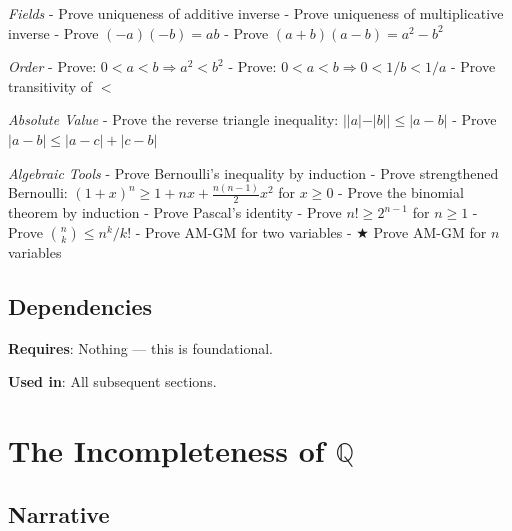 \documentclass[
  10pt,
  letterpaper,
]{scrbook}
\newcommand{\QQ}{\mathbb{Q}}
\begin{document}
\emph{Fields} - Prove uniqueness of additive inverse - Prove uniqueness
of multiplicative inverse - Prove \((-a)(-b) = ab\) - Prove
\((a+b)(a-b) = a^2 - b^2\)

\emph{Order} - Prove: \(0 < a < b \Rightarrow a^2 < b^2\) - Prove:
\(0 < a < b \Rightarrow 0 < 1/b < 1/a\) - Prove transitivity of \(<\)

\emph{Absolute Value} - Prove the reverse triangle inequality:
\(||a| - |b|| \leq |a - b|\) - Prove \(|a - b| \leq |a - c| + |c - b|\)

\emph{Algebraic Tools} - Prove Bernoulli's inequality by induction -
Prove strengthened Bernoulli:
\((1+x)^n \geq 1 + nx + \frac{n(n-1)}{2}x^2\) for \(x \geq 0\) - Prove
the binomial theorem by induction - Prove Pascal's identity - Prove
\(n! \geq 2^{n-1}\) for \(n \geq 1\) - Prove
\(\binom{n}{k} \leq n^k / k!\) - Prove AM-GM for two variables - ★ Prove
AM-GM for \(n\) variables

\subsection{Dependencies}\label{dependencies}

\textbf{Requires}: Nothing --- this is foundational.

\textbf{Used in}: All subsequent sections.

\section{\texorpdfstring{The Incompleteness of
\(\QQ\)}{The Incompleteness of \textbackslash QQ}}\label{the-incompleteness-of-qq}

\subsection{Narrative}\label{narrative-1}
\end{document}
